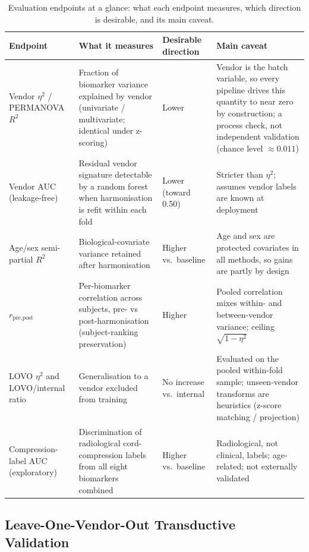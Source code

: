 \documentclass[12pt,a4paper]{article}
\begin{document}
\begin{table}[H]
\centering
\small
\setlength{\tabcolsep}{4pt}
\caption{Evaluation endpoints at a glance: what each endpoint measures, which direction is desirable, and its main caveat.}
\label{tab:endpoints}
\begin{tabularx}{\textwidth}{@{}>{\raggedright\arraybackslash}p{3.0cm}>{\raggedright\arraybackslash}X>{\raggedright\arraybackslash}p{2.2cm}>{\raggedright\arraybackslash}X@{}}
\toprule
Endpoint & What it measures & Desirable direction & Main caveat \\
\midrule
Vendor $\eta^2$ / PERMANOVA $R^2$ & Fraction of biomarker variance explained by vendor (univariate / multivariate; identical under z-scoring) & Lower & Vendor is the batch variable, so every pipeline drives this quantity to near zero by construction; a process check, not independent validation (chance level $\approx0.011$) \\
Vendor AUC (leakage-free) & Residual vendor signature detectable by a random forest when harmonisation is refit within each fold & Lower (toward 0.50) & Stricter than $\eta^2$; assumes vendor labels are known at deployment \\
Age/sex semi-partial $R^2$ & Biological-covariate variance retained after harmonisation & Higher vs.\ baseline & Age and sex are protected covariates in all methods, so gains are partly by design \\
$r_{\text{pre,post}}$ & Per-biomarker correlation across subjects, pre- vs post-harmonisation (subject-ranking preservation) & Higher & Pooled correlation mixes within- and between-vendor variance; ceiling $\sqrt{1-\eta^2}$ \\
LOVO $\eta^2$ and LOVO/internal ratio & Generalisation to a vendor excluded from training & No increase vs.\ internal & Evaluated on the pooled within-fold sample; unseen-vendor transforms are heuristics (z-score matching / projection) \\
Compression-label AUC (exploratory) & Discrimination of radiological cord-compression labels from all eight biomarkers combined & Higher vs.\ baseline & Radiological, not clinical, labels; age-related; not externally validated \\
\bottomrule
\end{tabularx}
\end{table}

\subsection{Leave-One-Vendor-Out Transductive Validation}
\end{document}

